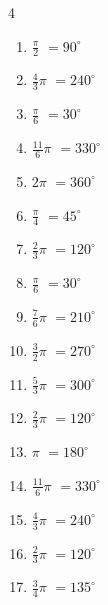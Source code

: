 \begin{multicols}{4}
\begin{enumerate}
\columnbreak %

  \item $\displaystyle \frac{\pi}{2}$
        $\displaystyle =90^{\circ}$

  \item $\displaystyle \frac{4}{3}\pi$
        $\displaystyle =240^{\circ}$

  \item $\displaystyle \frac{\pi}{6}$
        $\displaystyle =30^{\circ}$

  \item $\displaystyle \frac{11}{6}\pi$
        $\displaystyle =330^{\circ}$

  \item $\displaystyle 2\pi$
        $\displaystyle =360^{\circ}$

  \item $\displaystyle \frac{\pi}{4}$
        $\displaystyle =45^{\circ}$

  \item $\displaystyle \frac{2}{3}\pi$
        $\displaystyle =120^{\circ}$

  \item $\displaystyle \frac{\pi}{6}$
        $\displaystyle =30^{\circ}$

  \item $\displaystyle \frac{7}{6}\pi$
        $\displaystyle =210^{\circ}$

  \item $\displaystyle \frac{3}{2}\pi$
        $\displaystyle =270^{\circ}$

  \item $\displaystyle \frac{5}{3}\pi$
        $\displaystyle =300^{\circ}$

  \item $\displaystyle \frac{2}{3}\pi$
        $\displaystyle =120^{\circ}$

  \item $\displaystyle \pi$
        $\displaystyle =180^{\circ}$

  \item $\displaystyle \frac{11}{6}\pi$
        $\displaystyle =330^{\circ}$

  \item $\displaystyle \frac{4}{3}\pi$
        $\displaystyle =240^{\circ}$

  \item $\displaystyle \frac{2}{3}\pi$
        $\displaystyle =120^{\circ}$

  \item $\displaystyle \frac{3}{4}\pi$
        $\displaystyle =135^{\circ}$


\end{enumerate}
\end{multicols}
